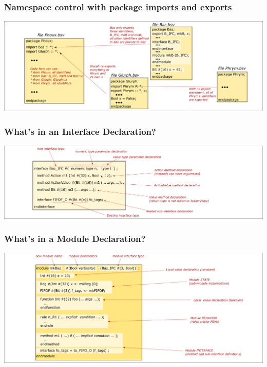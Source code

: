 
\begin{frame}
\frametitle{Namespace control with package imports and exports}

\begin{center}
\includegraphics[width=\textwidth]{../Figures/Fig_BSV_namespace_control}
\end{center}

\end{frame}


\begin{frame}
\frametitle{What's in an Interface Declaration?}

\begin{center}
\includegraphics[width=\textwidth]{../Figures/Fig_BSV_whats_in_an_interface_decl}
\end{center}

\end{frame}


\begin{frame}
\frametitle{What's in a Module Declaration?}

\begin{center}
\includegraphics[width=\textwidth]{../Figures/Fig_BSV_whats_in_a_module_decl}
\end{center}

\end{frame}

